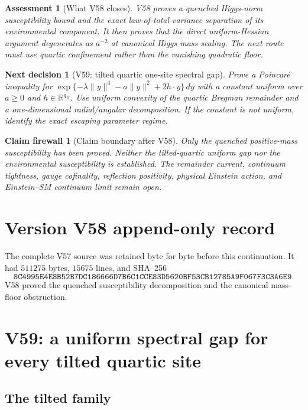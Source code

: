 \documentclass[11pt]{article}
\newtheorem{firewall}[theorem]{Claim firewall}
\newtheorem{decision}[theorem]{Next decision}
\newtheorem{assessment}[theorem]{Assessment}
\theoremstyle{remark}
\begin{document}
\begin{assessment}[What V58 closes]
\label{ass:v17v58-status}
V58 proves a quenched Higgs-norm susceptibility bound and the exact
law-of-total-variance separation of its environmental component.  It
then proves that the direct uniform-Hessian argument degenerates as
\(a^{-2}\) at canonical Higgs mass scaling.  The next route must use
quartic confinement rather than the vanishing quadratic floor.
\end{assessment}

\begin{decision}[V59: tilted quartic one-site spectral gap]
\label{dec:v17v58-next}
Prove a Poincar\'e inequality for
\(\exp\{-\lambda\|y\|^4-a\|y\|^2+2h\cdot y\}\,dy\)
with a constant uniform over \(a\geq0\) and \(h\in\mathbb R^{q_H}\).
Use uniform convexity of the quartic Bregman remainder and a
one-dimensional radial/angular decomposition.  If the constant is not
uniform, identify the exact escaping parameter regime.
\end{decision}

\begin{firewall}[Claim boundary after V58]
\label{fire:v17v58}
Only the quenched positive-mass susceptibility has been proved.
Neither the tilted-quartic uniform gap nor the environmental
susceptibility is established.  The remainder current, continuum
tightness, gauge cofinality, reflection positivity, physical Einstein
action, and Einstein--SM continuum limit remain open.
\end{firewall}

\section*{Version V58 append-only record}
The complete V57 source was retained byte for byte before this
continuation.  It had \(511275\) bytes, \(15675\) lines, and SHA--256
\[
 \texttt{8C4995E4E8B52B7DC186666D7B6C1CCE83D5620BF53CB12785A9F067F3C3A6E9}.
\]
V58 proved the quenched susceptibility decomposition and the
canonical mass-floor obstruction.


\section{V59: a uniform spectral gap for every tilted quartic site}
\label{sec:v17v59}

\subsection{The tilted family}
\end{document}

